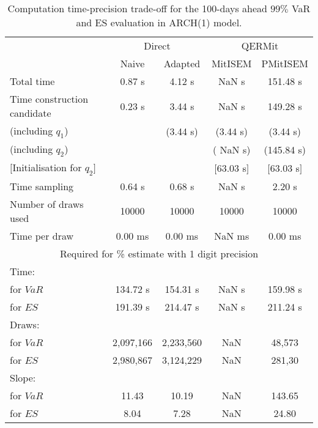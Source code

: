 { \renewcommand{\arraystretch}{1.3} 
\begin{table}[h] 
\centering 
\caption{Computation time-precision trade-off for the 100-days ahead  $99\%$ VaR and ES evaluation in ARCH(1) model.} 
\label{tab:time_precision_arch} 
\begin{tabular}{lcccc}  
  & \multicolumn{2}{c}{Direct} & \multicolumn{2}{c}{QERMit}  \\ \cline{2-5} 
  & Naive & Adapted & MitISEM & PMitISEM  \\ \hline 
Total time & 0.87 s & 4.12 s &  NaN s & 151.48 s \\ 
Time construction candidate & 0.23 s & 3.44 s &  NaN s & 149.28 s \\ 
 (including $q_{1}$) &   &  (3.44 s) & (3.44 s) & (3.44 s) \\ 
 (including $q_{2}$) &   &  & ( NaN s) & (145.84 s) \\ 
$[$Initialisation for $q_{2}$$]$&   &   & $[$63.03 s$]$ & $[$63.03 s$]$ \\ 
Time sampling & 0.64 s & 0.68 s &  NaN s & 2.20 s  \\  
Number of draws used & 10000 & 10000 & 10000 & 10000 \\ 
Time per draw & 0.00 ms & 0.00 ms &  NaN ms & 0.00 ms \\ \hline 
\multicolumn{5}{c}{Required for \% estimate with 1 digit precision} \\ \hline 
Time: &  &  &   &  \\ 
\hspace{1cm} for $VaR$ & 134.72 s & 154.31 s &  NaN s & 159.98 s \\ 
\hspace{1cm} for $ES$ & 191.39 s & 214.47 s &  NaN s & 211.24 s \\ 
Draws: &  &  &   &  \\ 
\hspace{1cm} for $VaR$ & 2,097,166 & 2,233,560  & NaN  & 48,573  \\ 
\hspace{1cm} for $ES$ & 2,980,867 & 3,124,229  & NaN   & 281,30  \\ 
\hline 
Slope: &  &  &   &  \\ 
\hspace{1cm} for $VaR$ & 11.43 & 10.19  &  NaN  & 143.65  \\ 
\hspace{1cm} for $ES$ & 8.04 & 7.28  &  NaN   & 24.80  \\  \hline 
\end{tabular} 
\end{table} 
} 
